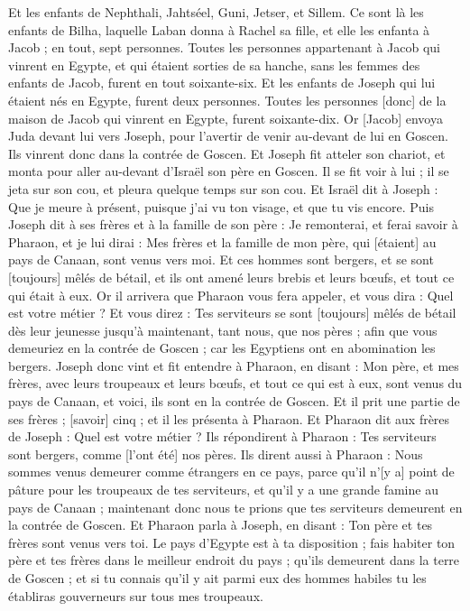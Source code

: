 \begin{multicols}{2}
Et les enfants de Nephthali, Jahtséel, Guni, Jetser, et Sillem.
Ce sont là les enfants de Bilha, laquelle Laban donna à Rachel sa fille, et elle les enfanta à Jacob ; en tout, sept personnes.
Toutes les personnes appartenant à Jacob qui vinrent en Egypte, et qui étaient sorties de sa hanche, sans les femmes des enfants de Jacob, furent en tout soixante-six.
Et les enfants de Joseph qui lui étaient nés en Egypte, furent deux personnes. Toutes les personnes [donc] de la maison de Jacob qui vinrent en Egypte, furent soixante-dix.
Or [Jacob] envoya Juda devant lui vers Joseph, pour l'avertir de venir au-devant de lui en Goscen. Ils vinrent donc dans la contrée de Goscen.
Et Joseph fit atteler son chariot, et monta pour aller au-devant d'Israël son père en Goscen. Il se fit voir à lui ; il se jeta sur son cou, et pleura quelque temps sur son cou.
Et Israël dit à Joseph : Que je meure à présent, puisque j'ai vu ton visage, et que tu vis encore.
Puis Joseph dit à ses frères et à la famille de son père : Je remonterai, et ferai savoir à Pharaon, et je lui dirai : Mes frères et la famille de mon père, qui [étaient] au pays de Canaan, sont venus vers moi.
Et ces hommes sont bergers, et se sont [toujours] mêlés de bétail, et ils ont amené leurs brebis et leurs bœufs, et tout ce qui était à eux.
Or il arrivera que Pharaon vous fera appeler, et vous dira : Quel est votre métier ?
Et vous direz : Tes serviteurs se sont [toujours] mêlés de bétail dès leur jeunesse jusqu'à maintenant, tant nous, que nos pères ; afin que vous demeuriez en la contrée de Goscen ; car les Egyptiens ont en abomination les bergers.
\VerseOne{}Joseph donc vint et fit entendre à Pharaon, en disant : Mon père, et mes frères, avec leurs troupeaux et leurs bœufs, et tout ce qui est à eux, sont venus du pays de Canaan, et voici, ils sont en la contrée de Goscen.
Et il prit une partie de ses frères ; [savoir] cinq ; et il les présenta à Pharaon.
Et Pharaon dit aux frères de Joseph : Quel est votre métier ? Ils répondirent à Pharaon : Tes serviteurs sont bergers, comme [l'ont été] nos pères.
Ils dirent aussi à Pharaon : Nous sommes venus demeurer comme étrangers en ce pays, parce qu'il n'[y a] point de pâture pour les troupeaux de tes serviteurs, et qu'il y a une grande famine au pays de Canaan ; maintenant donc nous te prions que tes serviteurs demeurent en la contrée de Goscen.
Et Pharaon parla à Joseph, en disant : Ton père et tes frères sont venus vers toi.
Le pays d'Egypte est à ta disposition ; fais habiter ton père et tes frères dans le meilleur endroit du pays ; qu'ils demeurent dans la terre de Goscen ; et si tu connais qu'il y ait parmi eux des hommes habiles tu les établiras gouverneurs sur tous mes troupeaux.

\end{multicols}
